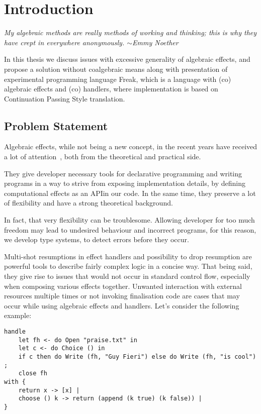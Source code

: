 \documentclass[declaration,shortabstract]{iithesis}
\author{Mateusz Urbańczyk}
\date{1 września 2020}                     %
\theoremstyle{definition} \newtheorem{definition}{Definition}[chapter]
\theoremstyle{remark} \newtheorem{remark}[definition]{Observation}
\theoremstyle{plain} \newtheorem{theorem}[definition]{Theorem}
\theoremstyle{plain} \newtheorem{lemma}[definition]{Lemma}
\begin{document}
\chapter{Introduction}\label{chapter:introduction}

\textit{
    My algebraic methods are really methods of working and thinking; this is why
    they have crept in everywhere anonymously. $\sim{}$Emmy Noether
}

In this thesis we discuss issues with excessive generality of algebraic effects,
and propose a solution without coalgebraic means along with presentation of
experimental programming language Freak, which is a language with (co) algebraic
effects and (co) handlers, where implementation is based on Continuation Passing
Style translation.

\section{Problem Statement}\label{sec:problem-statement}

Algebraic effects, while not being a new concept, in the recent years have
received a lot of attention~\cite{effects-bibliography}, both from the theoretical
and practical side.

They give developer necessary tools for declarative programming and writing
programs in a way to strive from exposing implementation details, by defining
computational effects as an API\@ in our code. In the same time, they preserve
a lot of flexibility and have a strong theoretical background.

In fact, that very flexibility can be troublesome. Allowing developer for too
much freedom may lead to undesired behaviour and incorrect programs, for this
reason, we develop type systems, to detect errors before they occur.

Multi-shot resumptions in effect handlers and possibility to drop resumption
are powerful tools to describe fairly complex logic in a concise way. That being
said, they give rise to issues that would not occur in standard control flow,
especially when composing various effects together. Unwanted interaction with
external resources multiple times or not invoking finalisation code are cases
that may occur while using algebraic effects and handlers. Let's consider the
following example:

\begin{verbatim}
handle
    let fh <- do Open "praise.txt" in
    let c <- do Choice () in
    if c then do Write (fh, "Guy Fieri") else do Write (fh, "is cool") ;
    close fh
with {
    return x -> [x] |
    choose () k -> return (append (k true) (k false)) |
}
\end{verbatim}
\end{document}

